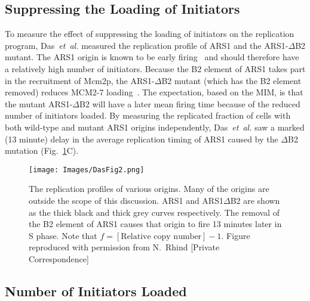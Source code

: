 {		
		\subsection{Suppressing the Loading of Initiators}
		\label{subsec:SuppressingInitiators}
		
		To measure the effect of suppressing the loading of initiators on the replication program, Das~\emph{et~al.} measured the replication profile of ARS1 and the ARS1-$\Delta$B2 mutant.
		The ARS1 origin is known to be early firing~\cite{OriDB} and should therefore have a relatively high number of initiators.
		Because the B2 element of ARS1 takes part in the recruitment of Mcm2p, the ARS1-$\Delta$B2 mutant (which has the B2 element removed) reduces MCM2-7 loading~\cite{ARS1Mutant}.
		The expectation, based on the MIM, is that the mutant ARS1-$\Delta$B2 will have a later mean firing time because of the reduced number of initiators loaded.
		By measuring the replicated fraction of cells with both wild-type and mutant ARS1 origins independently, Das~\emph{et~al.} saw a marked (13 minute) delay in the average replication timing of ARS1 caused by the $\Delta$B2 mutation (Fig.~\ref{fig:Das2}C).
		
		\begin{figure}[tbh]
			\begin{center}
				\texttt{[image: Images/DasFig2.png]}
			\end{center}
				\caption[Replication profile of various origins]{\label{fig:Das2} The replication profiles of various origins.
					Many of the origins are outside the scope of this discussion.
					ARS1 and ARS1$\Delta$B2 are shown as the thick black and thick grey curves respectively.
					The removal of the B2 element of ARS1 causes that origin to fire 13 minutes later in S phase.
					Note that $f = [\text{Relative copy number}] - 1$.
					Figure reproduced with permission from N.~Rhind [Private Correspondence]~\cite{Rhind}}
		\end{figure}
		
		
		\subsection{Number of Initiators Loaded}
		\label{subsec:NoInitiatorsLoaded}
		
}
